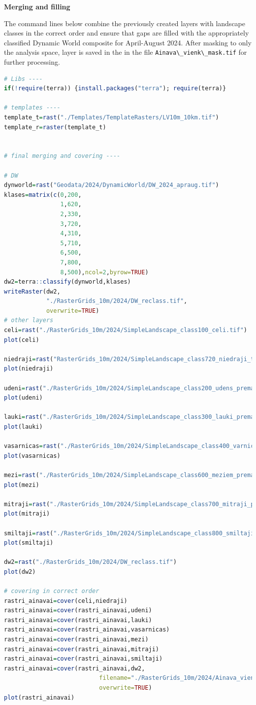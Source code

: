 \documentclass[
]{book}
\newcommand{\passthrough}[1]{#1}
\begin{document}
\textbf{Merging and filling}

The command lines below combine the previously created layers with landscape
classes in the correct order and ensure that gaps are filled with the appropriately
classified Dynamic World composite for April-August 2024. After masking to only
the analysis space, layer is saved in the in the file \passthrough{\lstinline!Ainava\_vienk\_mask.tif!}
for further processing.

\begin{lstlisting}[language=R]
# Libs ----
if(!require(terra)) {install.packages("terra"); require(terra)}

# templates ----
template_t=rast("./Templates/TemplateRasters/LV10m_10km.tif")
template_r=raster(template_t)


# final merging and covering ----

# DW  
dynworld=rast("Geodata/2024/DynamicWorld/DW_2024_apraug.tif")
klases=matrix(c(0,200,
                1,620,
                2,330,
                3,720,
                4,310,
                5,710,
                6,500,
                7,800,
                8,500),ncol=2,byrow=TRUE)
dw2=terra::classify(dynworld,klases)
writeRaster(dw2,
            "./RasterGrids_10m/2024/DW_reclass.tif",
            overwrite=TRUE)
# other layers
celi=rast("./RasterGrids_10m/2024/SimpleLandscape_class100_celi.tif")
plot(celi)

niedraji=rast("RasterGrids_10m/2024/SimpleLandscape_class720_niedraji_topo.tif")
plot(niedraji)

udeni=rast("./RasterGrids_10m/2024/SimpleLandscape_class200_udens_premask.tif")
plot(udeni)

lauki=rast("./RasterGrids_10m/2024/SimpleLandscape_class300_lauki_premask.tif")
plot(lauki)

vasarnicas=rast("./RasterGrids_10m/2024/SimpleLandscape_class400_varnicas_premask.tif")
plot(vasarnicas)

mezi=rast("./RasterGrids_10m/2024/SimpleLandscape_class600_meziem_premask.tif")
plot(mezi)

mitraji=rast("./RasterGrids_10m/2024/SimpleLandscape_class700_mitraji_premask.tif")
plot(mitraji)

smiltaji=rast("./RasterGrids_10m/2024/SimpleLandscape_class800_smiltaji_premask.tif")
plot(smiltaji)

dw2=rast("./RasterGrids_10m/2024/DW_reclass.tif")
plot(dw2)

# covering in correct order
rastri_ainavai=cover(celi,niedraji)
rastri_ainavai=cover(rastri_ainavai,udeni)
rastri_ainavai=cover(rastri_ainavai,lauki)
rastri_ainavai=cover(rastri_ainavai,vasarnicas)
rastri_ainavai=cover(rastri_ainavai,mezi)
rastri_ainavai=cover(rastri_ainavai,mitraji)
rastri_ainavai=cover(rastri_ainavai,smiltaji)
rastri_ainavai=cover(rastri_ainavai,dw2,
                           filename="./RasterGrids_10m/2024/Ainava_vienkarsa.tif",
                           overwrite=TRUE)
plot(rastri_ainavai)


\end{lstlisting}
\end{document}
